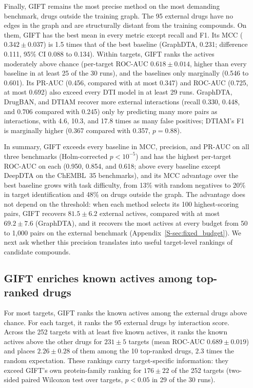 \documentclass[10pt,letterpaper]{article}
\begin{document}
Finally, GIFT remains the most precise method on the most demanding benchmark, drugs outside the training graph. The 95 external drugs have no edges in the graph and are structurally distant from the training compounds. On them, GIFT has the best mean in every metric except recall and F1. Its MCC ($0.342\pm0.037$) is 1.5 times that of the best baseline (GraphDTA, 0.231; difference 0.111, 95\% CI 0.088 to 0.134). Within targets, GIFT ranks the actives moderately above chance (per-target ROC-AUC $0.618\pm0.014$, higher than every baseline in at least 25 of the 30 runs), and the baselines only marginally (0.546 to 0.601). Its PR-AUC (0.456, compared with at most 0.347) and ROC-AUC (0.725, at most 0.692) also exceed every DTI model in at least 29 runs. GraphDTA, DrugBAN, and DTIAM recover more external interactions (recall 0.330, 0.448, and 0.706 compared with 0.245) only by predicting many more pairs as interactions, with 4.6, 10.3, and 17.8 times as many false positives; DTIAM's F1 is marginally higher (0.367 compared with 0.357, $p=0.88$).

In summary, GIFT exceeds every baseline in MCC, precision, and PR-AUC on all three benchmarks (Holm-corrected $p<10^{-5}$) and has the highest per-target ROC-AUC on each (0.950, 0.854, and 0.618; above every baseline except DeepDTA on the ChEMBL~35 benchmarks), and its MCC advantage over the best baseline grows with task difficulty, from 13\% with random negatives to 20\% in target identification and 48\% on drugs outside the graph. The advantage does not depend on the threshold: when each method selects its 100 highest-scoring pairs, GIFT recovers $81.5\pm6.2$ external actives, compared with at most $69.2\pm7.6$ (GraphDTA), and it recovers the most actives at every budget from 50 to 1,000 pairs on the external benchmark (Appendix~\ref{S-sec:fixed_budget}). We next ask whether this precision translates into useful target-level rankings of candidate compounds.

\subsection{GIFT enriches known actives among top-ranked drugs}
\label{sec:leadprio}

For most targets, GIFT ranks the known actives among the external drugs above chance. For each target, it ranks the 95 external drugs by interaction score. Across the 252 targets with at least five known actives, it ranks the known actives above the other drugs for $231\pm5$ targets (mean ROC-AUC $0.689\pm0.019$) and places $2.26\pm0.28$ of them among the 10 top-ranked drugs, 2.3 times the random expectation. These rankings carry target-specific information: they exceed GIFT's own protein-family ranking for $176\pm22$ of the 252 targets (two-sided paired Wilcoxon test over targets, $p<0.05$ in 29 of the 30 runs).
\end{document}

